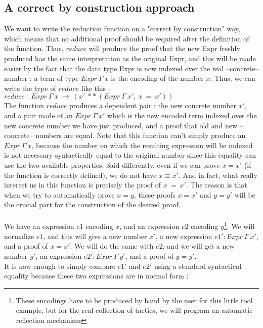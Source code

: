 \subsection{A correct by construction approach}

We want to write the reduction function on a "correct by construction" way, which means that no additional proof should be required after the definition of the function. Thus, $reduce$ will produce the proof that the new Expr freshly produced has the same interpretation as the original Expr, and this will be made easier by the fact that the data type Expr is now indexed over the real --concrete-- number : a term of type $Expr\ \Gamma\ x$ is the encoding of the number $x$.
Thus, we can write the type of $reduce$ like this : \\
$reduce\ :\ Expr\ \Gamma\ x\ \rightarrow\ (x'\ **\ (Expr\ \Gamma\ x',\ x\ =\ x'))$ \\
The function $reduce$ produces a dependent pair : the new concrete number $x'$, and a pair made of an $Expr\ \Gamma\ x'$ which is the new encoded term indexed over the new concrete number we have just produced, and a proof that old and new --concrete-- numbers are equal.
Note that this function can't simply produce an $Expr\ \Gamma\ x$, because the number on which the resulting expression will be indexed is not necessary syntactically equal to the original number since this equality can use the two available properties. Said differently, even if we can prove $x=x'$ (if the function is correctly defined), we do not have $x \equiv x'$.
And in fact, what really interest us in this function is precisely the proof of $x\ =\ x'$.
The reason is that when we try to automatically prove $x=y$, these proofs $x=x'$ and $y=y'$ will be the crucial part for the construction of the desired proof. \\
\\
We have an expression $e1$ encoding $x$, and an expression $e2$ encoding $y$\footnote{These encodings have to be produced by hand by the user for this little tool example, but for the real collection of tactics, we will program an automatic reflection mechanism}.
We will normalize $e1$, and this will give a new number $x'$, a new expression $e1':Expr\ \Gamma\ x'$, and a proof of $x=x'$. We will do the same with $e2$, and we will get a new number $y'$, an expression $e2':Expr\ \Gamma\ y'$, and a proof of $y=y'$. \\
It is now enough to simply compare $e1'$ and $e2'$ using a standard syntactical equality because these two expressions are in normal form :


